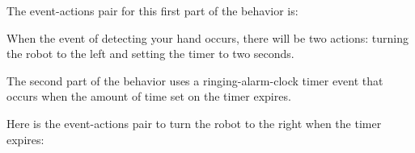
The event-actions pair for this first part of the behavior is:

When the event of detecting your hand occurs, there will be two actions:
turning the robot to the left and setting the timer to two seconds.

The second part of the behavior uses a ringing-alarm-clock timer event
 that occurs when the amount of time set on the timer
expires.

Here is the event-actions pair to turn the robot to the right when the
timer expires: 

\bigskip


